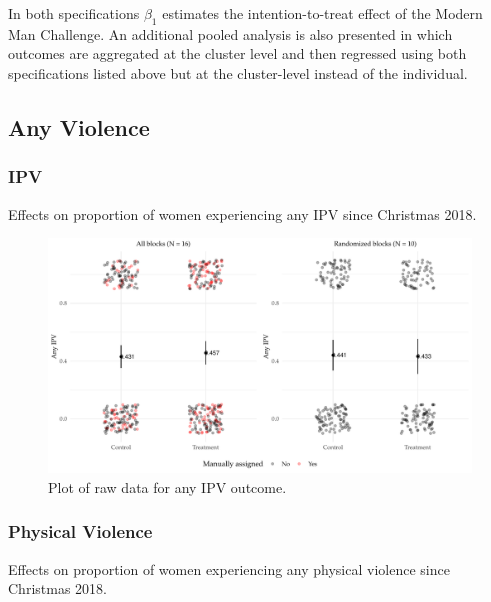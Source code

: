 \documentclass[11pt,english]{article}
\begin{document}
In both specifications $\beta_1$ estimates the intention-to-treat effect of the Modern Man Challenge. An additional pooled analysis is also presented in which outcomes are aggregated at the cluster level and then regressed using both specifications listed above but at the cluster-level instead of the individual.

\subsection{Any Violence}

\subsubsection{IPV}

\begin{table}[H]
\centering

\caption{Effects on proportion of women experiencing any IPV since Christmas 2018.}
\label{tab:ipv}
\end{table}

\begin{figure}[H]
\centering
\includegraphics[width = \textwidth]{figures/ipv_plot.pdf}
\caption{Plot of raw data for any IPV outcome.}
\label{fig:ipv_plot}
\end{figure}

\subsubsection{Physical Violence}

\begin{table}[H]
\centering

\caption{Effects on proportion of women experiencing any physical violence since Christmas 2018.}
\label{tab:physical}
\end{table}
\end{document}
